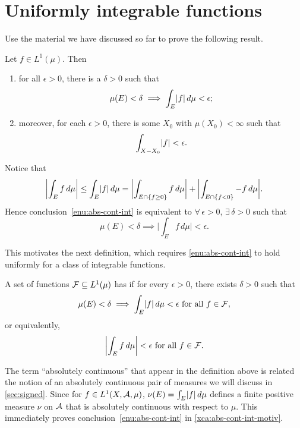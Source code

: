 \section{Uniformly integrable functions}

Use the material we have discussed so far to prove the following result.
\begin{xca} \label{xca:abs-cont-int-motiv}
Let $f \in L^1(\mu)$. Then
\begin{enumerate}
    \item \label{enu:abs-cont-int}for all $\epsilon > 0$, there is a $\delta > 0$ such that \[
    \mu(E) < \delta \implies \int_E \lvert f \rvert \,d\mu < \epsilon;
\]
    \item moreover, for each $\epsilon > 0$, there is some $X_0$ with $\mu(X_0) < \infty$ such that \[
    \int_{X - X_0} \lvert f \rvert < \epsilon.
\]
\end{enumerate}
\end{xca}

Notice that \[
    \biggl\vert\int_E f \,d\mu \biggr\vert \leq \int_E \lvert f \rvert \,d\mu = \biggl\vert\int_{E \cap \{f \geq 0\}} f\,d\mu\biggr\vert + \biggl\vert\int_{E \cap \{f < 0\}} -f \,d\mu\biggr\vert.\]
Hence conclusion~\ref{enu:abs-cont-int} is equivalent to $\forall\,\epsilon > 0$, $\exists\, \delta > 0$ such that \[
    \mu(E) < \delta \implies \biggl\vert\int_E f \,d\mu\biggr\vert <\epsilon.
\]

This motivates the next definition, which requires \ref{enu:abs-cont-int} to hold uniformly for a class of integrable functions.

\begin{defn}
    A set of functions $\mathcal{F} \subseteq L^1(\mu)$ has  if for every $\epsilon > 0$, there exists $\delta > 0$ such that \[
        \mu(E) < \delta \implies \int_E \lvert f \rvert \,d\mu <\epsilon \text{ for all $f \in \mathcal{F}$},
    \] or equivalently, \[ \biggl\vert\int_E f \,d\mu\biggr\vert <\epsilon \text{ for all $f \in \mathcal{F}$}.
    \]
\end{defn}

The term ``absolutely continuous'' that appear in the definition above is related the notion of an absolutely continuous pair of measures we will discuss in \cref{sec:signed}. Since for $f \in L^1(X,\mathcal{A},\mu)$, $\nu(E) = \int_E \lvert f \rvert \,d\mu$ defines a finite positive measure $\nu$ on $\mathcal{A}$ that is absolutely continuous with respect to $\mu$. This immediately proves conclusion~\ref{enu:abs-cont-int} in \cref{xca:abs-cont-int-motiv}.

